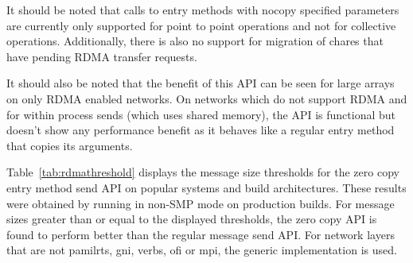\vspace{0.1in}
\noindent
It should be noted that calls to entry methods with nocopy specified parameters are
currently only supported for point to point operations and not for collective operations.
Additionally, there is also no support for migration of chares that have pending RDMA transfer
requests.

\vspace{0.1in}
\noindent
It should also be noted that the benefit of this API can be seen for large arrays on
only RDMA enabled networks. On networks which do not support RDMA and for within process sends
(which uses shared memory), the API is functional but doesn't show any performance benefit as it
behaves like a regular entry method that copies its arguments.

Table~\ref{tab:rdmathreshold} displays the message size thresholds for the zero copy entry method
send API on popular systems and build architectures. These results were obtained by running
 in non-SMP mode
on production builds. For message sizes greater than or equal to the displayed thresholds,
the zero copy API is found to perform better than the regular message send API. For network layers
that are not pamilrts, gni, verbs, ofi or mpi, the generic implementation is used.

